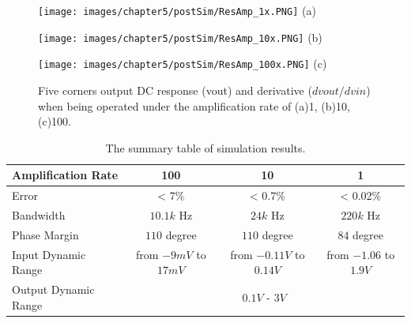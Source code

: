{\begin{figure}[tb]
    \begin{minipage}[t]{0.47\textwidth}
        \centering
        \texttt{[image: images/chapter5/postSim/ResAmp\_1x.PNG]}
        (a)
    \end{minipage}
    \begin{minipage}[t]{0.47\textwidth}
        \centering
        \texttt{[image: images/chapter5/postSim/ResAmp\_10x.PNG]}
        (b)
    \end{minipage}
    \begin{minipage}[t]{1\textwidth}
        \centering
        \texttt{[image: images/chapter5/postSim/ResAmp\_100x.PNG]}
        (c)
    \end{minipage}
    \caption{Five corners output DC response (vout) and derivative ($dvout/dvin$) when being operated under the amplification rate of (a)1, (b)10, (c)100.}
    \label{fig:sim:ResAmp}
\end{figure}


\begin{table}[!hb]
    {\fontfamily{}\fontsize{10}{14}\selectfont
    \centering
    \begin{tabular}{l|c|c|c}
        Amplification Rate & 100 & 10 & 1\\
        \hline
        Error & < 7\% & < 0.7\% & < 0.02\% \\
        \hline
        Bandwidth & $10.1k$ Hz & $24k$ Hz & $220k$ Hz\\
        \hline
        Phase Margin & $110$ degree & $110$ degree & $84$ degree \\
        \hline
        Input Dynamic Range & from $-9mV$ to $17mV$ & from $-0.11V$ to $0.14V$ & from $-1.06$ to $1.9V$\\
        \hline
        Output Dynamic Range & \multicolumn{3}{c}{$0.1V$ - $3V$}\\
    \end{tabular}
    \caption{The summary table of simulation results.}
    \label{tb:sim:ResAmp}
    }
\end{table}



}
